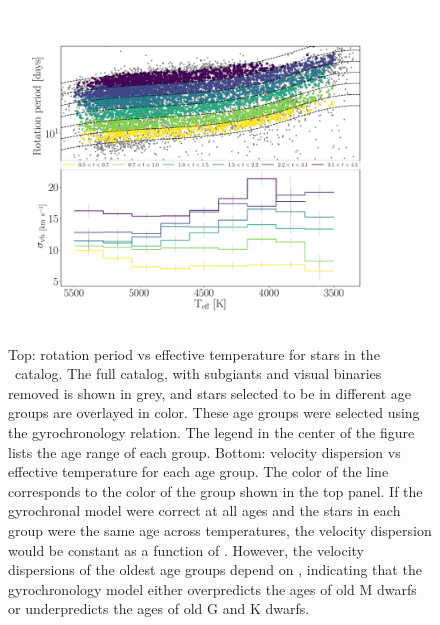 \begin{figure}
  \caption{
Top: rotation period vs effective temperature for stars in the \mct\
    catalog.
    The full catalog, with subgiants and visual binaries removed is shown in
    grey, and stars selected to be in different age groups are overlayed in
    color.
    These age groups were selected using the \citet{angus2019} gyrochronology
    relation.
The legend in the center of the figure lists the age range of each group.
    Bottom: velocity dispersion vs effective temperature for each age group.
The color of the line corresponds to the color of the group shown in the top
    panel.
If the gyrochronal model were correct at all ages and the stars in each group
    were the same age across temperatures, the velocity dispersion would be
    constant as a function of \teff.
However, the velocity dispersions of the oldest age groups depend on \teff,
    indicating that the \citet{angus2019} gyrochronology model either
    overpredicts the ages of old M dwarfs or underpredicts the ages of old G
    and K dwarfs.
}
  \centering
    \includegraphics[width=1\textwidth]{age_cut}
\label{fig:age_cut}
\end{figure}


